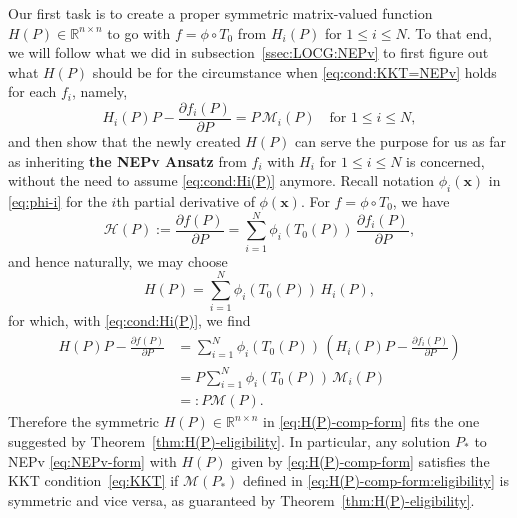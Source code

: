 \documentclass[11pt]{article}
\def\bx{\pmb{x}}
\def\bbR{\mathbb{R}}
\def\scrH{\mathscr{H}}
\def\scrM{\mathscr{M}}
\theoremstyle{definition}
\numberwithin{equation}{section}
\begin{document}
Our first task is to create a proper symmetric matrix-valued function $H(P)\in\bbR^{n\times n}$
to go with $f=\phi\circ T_0$ from $H_i(P)$ for $1\le i\le N$. To that end,
we will follow what we did in subsection~\ref{ssec:LOCG:NEPv} to first figure out what
$H(P)$ should be for the circumstance
when \eqref{eq:cond:KKT=NEPv} holds for each $f_i$, namely,
\begin{equation}\label{eq:cond:Hi(P)}
H_i(P)P-\frac {\partial f_i(P)}{\partial P}=P\,\scrM_i(P)
\quad\mbox{for $1\le i\le N$},
\end{equation}
and then show that the newly created $H(P)$ can serve the purpose for us as far as inheriting
{\bf the NEPv Ansatz} from $f_i$ with $H_i$ for $1\le i\le N$ is concerned,
without the need to assume \eqref{eq:cond:Hi(P)} anymore.
Recall notation $\phi_i(\bx)$ in \eqref{eq:phi-i} for the $i$th partial derivative of $\phi(\bx)$.
For $f=\phi\circ T_0$, we have
$$
\scrH(P):=\frac {\partial f(P)}{\partial P}
  =\sum_{i=1}^N\phi_i(T_0(P))\,\frac {\partial f_i(P)}{\partial P},
$$
and hence naturally, we may choose
\begin{equation}\label{eq:H(P)-comp-form}
H(P)=\sum_{i=1}^N\phi_i(T_0(P))\,H_i(P),
\end{equation}
for which, with \eqref{eq:cond:Hi(P)}, we find
\begin{align}
H(P)P-\frac {\partial f(P)}{\partial P}
 &=\sum_{i=1}^N\phi_i(T_0(P))\,\left(H_i(P)P-\frac {\partial f_i(P)}{\partial P}\right) \nonumber \\
 &=P\sum_{i=1}^N\phi_i(T_0(P))\,\scrM_i(P) \nonumber \\
 &=:P\scrM(P). \label{eq:H(P)-comp-form:eligibility}
\end{align}
Therefore the symmetric $H(P)\in\bbR^{n\times n}$ in \eqref{eq:H(P)-comp-form} fits the one suggested by
Theorem~\ref{thm:H(P)-eligibility}. In particular, any solution $P_*$ to NEPv \eqref{eq:NEPv-form}
with $H(P)$ given by \eqref{eq:H(P)-comp-form} satisfies the KKT condition~\eqref{eq:KKT} if
$\scrM(P_*)$ defined in \eqref{eq:H(P)-comp-form:eligibility} is symmetric and vice versa, as guaranteed by Theorem~\ref{thm:H(P)-eligibility}.
\end{document}
